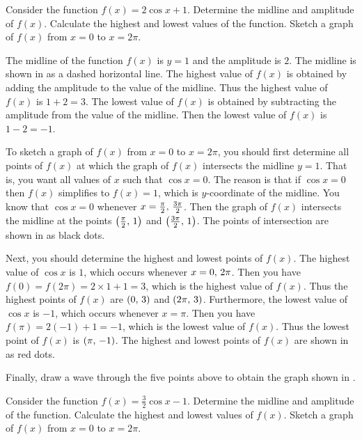\documentclass[a4paper,oneside,12pt]{article}
\begin{document}
\begin{example}
Consider the function $f(x) = 2 \cos x + 1$.  Determine the midline
and amplitude of $f(x)$.  Calculate the highest and lowest values of
the function.  Sketch a graph of $f(x)$ from $x = 0$ to $x = 2\pi$.
\end{example}

\begin{solution}
The midline of the function $f(x)$ is $y = 1$ and the amplitude is
$2$.  The midline is shown in  as a
dashed horizontal line.  The highest value of $f(x)$ is obtained by
adding the amplitude to the value of the midline.  Thus the highest
value of $f(x)$ is $1 + 2 = 3$.  The lowest value of $f(x)$ is
obtained by subtracting the amplitude from the value of the midline.
Then the lowest value of $f(x)$ is $1 - 2 = -1$.

To sketch a graph of $f(x)$ from $x = 0$ to $x = 2\pi$, you should
first determine all points of $f(x)$ at which the graph of $f(x)$
intersects the midline $y = 1$.  That is, you want all values of $x$
such that $\cos x = 0$.  The reason is that if $\cos x = 0$ then
$f(x)$ simplifies to $f(x) = 1$, which is $y$-coordinate of the
midline.  You know that $\cos x = 0$ whenever
$x = {\frac{\pi}{2}},\, {\frac{3\pi}{2}}$.  Then the graph of $f(x)$
intersects the midline at the points $\left\lparen{\frac{\pi}{2}},\, {1}\right\rparen$ and
$\left\lparen{\frac{3\pi}{2}},\, {1}\right\rparen$.  The points of intersection are shown in
 as black dots.

Next, you should determine the highest and lowest points of $f(x)$.
The highest value of $\cos x$ is $1$, which occurs whenever
$x = {0},\, {2\pi}$.  Then you have
$f(0) = f(2\pi) = 2 \times 1 + 1 = 3$, which is the highest value of
$f(x)$.  Thus the highest points of $f(x)$ are $\left\lparen{0},\, {3}\right\rparen$ and
$\left\lparen{2\pi},\, {3}\right\rparen$.  Furthermore, the lowest value of $\cos x$ is $-1$,
which occurs whenever $x = \pi$.  Then you have
$f(\pi) = 2 (-1) + 1 = -1$, which is the lowest value of $f(x)$.  Thus
the lowest point of $f(x)$ is $\left\lparen{\pi},\, {-1}\right\rparen$.  The highest and
lowest points of $f(x)$ are shown in
 as red dots.

Finally, draw a wave through the five points above to obtain the graph
shown in .
\end{solution}

\begin{exercise}
Consider the function $f(x) = \frac{3}{2} \cos x - 1$.  Determine the
midline and amplitude of the function.  Calculate the highest and
lowest values of $f(x)$.  Sketch a graph of $f(x)$ from $x = 0$ to
$x = 2\pi$.
\end{exercise}
\end{document}

